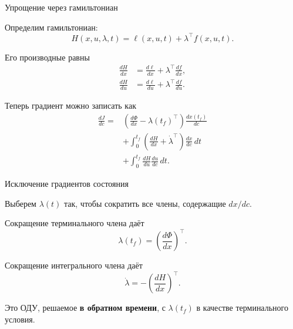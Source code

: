 \documentclass{beamer}
\begin{document}
	\begin{frame}{Упрощение через гамильтониан}
		\begin{flushleft}
			Определим гамильтониан:
			\[
			\boxed{
				H(x,u,\lambda,t)=\ell(x,u,t)+\lambda^\top f(x,u,t).
			}
			\]
			
			Его производные равны
			\[
			\begin{aligned}
				\frac{dH}{dx}
				&=\frac{d\ell}{dx}+\lambda^\top\frac{df}{dx},\\
				\frac{dH}{du}
				&=\frac{d\ell}{du}+\lambda^\top\frac{df}{du}.
			\end{aligned}
			\]
			
			\bigskip
			
			Теперь градиент можно записать как
			\[
			\boxed{
				\begin{aligned}
					\frac{dJ}{dc}
					={}&
					\left(\frac{d\Phi}{dx}-\lambda(t_f)^\top\right)
					\frac{dx(t_f)}{dc}\\
					&+\int_0^{t_f}
					\left(\frac{dH}{dx}+\dot{\lambda}^\top\right)
					\frac{dx}{dc}\,dt\\
					&+\int_0^{t_f}\frac{dH}{du}\frac{du}{dc}\,dt.
				\end{aligned}
			}
			\]
		\end{flushleft}
	\end{frame}
	
	\begin{frame}{Исключение градиентов состояния}
		\begin{flushleft}
			Выберем $\lambda(t)$ так, чтобы сократить все члены, содержащие
			$dx/dc$.
			
			\bigskip
			
			Сокращение терминального члена даёт
			\[
			\boxed{
				\lambda(t_f)=\left(\frac{d\Phi}{dx}\right)^\top.
			}
			\]
			
			\bigskip
			
			Сокращение интегрального члена даёт
			\[
			\boxed{
				\dot{\lambda}
				=-\left(\frac{dH}{dx}\right)^\top.
			}
			\]
			
			\bigskip
			
			Это ОДУ, решаемое \textbf{в обратном времени},
			с $\lambda(t_f)$ в качестве терминального условия.
		\end{flushleft}
	\end{frame}
	
\end{document}
